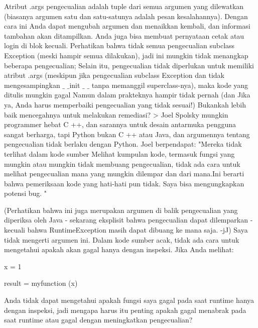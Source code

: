  \hspace*{0.64in} Atribut .args pengecualian adalah tuple dari semua argumen yang dilewatkan (biasanya argumen satu dan satu-satunya adalah pesan kesalahannya). Dengan cara ini Anda dapat mengubah argumen dan menaikkan kembali, dan informasi tambahan akan ditampilkan. Anda juga bisa membuat pernyataan cetak atau login di blok kecuali. Perhatikan bahwa tidak semua pengecualian subclass Exception (meski hampir semua dilakukan), jadi ini mungkin tidak menangkap beberapa pengecualian; Selain itu, pengecualian tidak diperlukan untuk memiliki atribut .args (meskipun jika pengecualian subclass Exception dan tidak mengesampingkan  $  \_  $ $  \_  $init $  \_  $ $  \_  $ tanpa memanggil superclass-nya), maka kode yang ditulis mungkin gagal Namun dalam prakteknya hampir tidak pernah (dan Jika ya, Anda harus memperbaiki pengecualian yang tidak sesuai!) Bukankah lebih baik mencegahnya untuk melakukan remediasi? >  
 Joel Spolsky mungkin programmer hebat C ++, dan sarannya untuk desain antarmuka pengguna sangat berharga, tapi Python bukan C ++ atau Java, dan argumennya tentang pengecualian tidak berlaku dengan Python. Joel berpendapat: "Mereka tidak terlihat dalam kode sumber Melihat kumpulan kode, termasuk fungsi yang mungkin atau mungkin tidak membuang pengecualian, tidak ada cara untuk melihat pengecualian mana yang mungkin dilempar dan dari mana.Ini berarti bahwa pemeriksaan kode yang hati-hati pun tidak. Saya bisa mengungkapkan potensi bug. " 

 \hspace*{0.64in} (Perhatikan bahwa ini juga merupakan argumen di balik pengecualian yang diperiksa oleh Java - sekarang eksplisit bahwa pengecualian dapat dilemparkan - kecuali bahwa RuntimeException masih dapat dibuang ke mana saja. -jJ) Saya tidak mengerti argumen ini. Dalam kode sumber acak, tidak ada cara untuk mengetahui apakah akan gagal hanya dengan inspeksi. Jika Anda melihat: 

\vspace{12pt}

\vspace{12pt}

x = 1 

result = myfunction (x) 
\vspace{20pt}

 \hspace*{0.64in} Anda tidak dapat mengetahui apakah fungsi saya gagal pada saat runtime hanya dengan inspeksi, jadi mengapa harus itu penting apakah gagal menabrak pada saat runtime atau gagal dengan meningkatkan pengecualian? 
 
